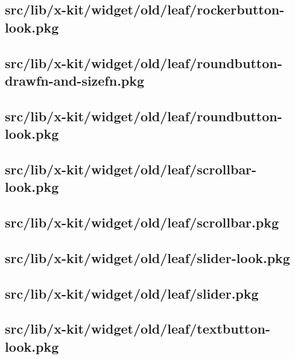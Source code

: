 \subsection{src/lib/x-kit/widget/old/leaf/rockerbutton-look.pkg}


\subsection{src/lib/x-kit/widget/old/leaf/roundbutton-drawfn-and-sizefn.pkg}


\subsection{src/lib/x-kit/widget/old/leaf/roundbutton-look.pkg}


\subsection{src/lib/x-kit/widget/old/leaf/scrollbar-look.pkg}


\subsection{src/lib/x-kit/widget/old/leaf/scrollbar.pkg}


\subsection{src/lib/x-kit/widget/old/leaf/slider-look.pkg}


\subsection{src/lib/x-kit/widget/old/leaf/slider.pkg}


\subsection{src/lib/x-kit/widget/old/leaf/textbutton-look.pkg}



